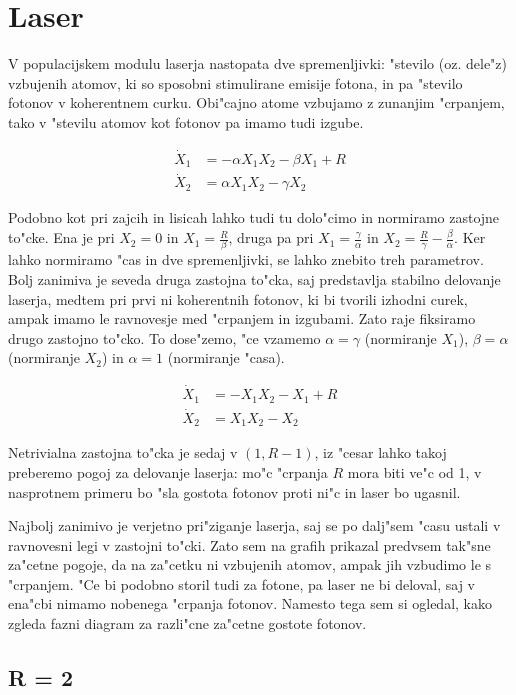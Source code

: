 \documentclass[a4paper,10pt]{article}
\begin{document}
\clearpage
\section{Laser}

V populacijskem modulu laserja nastopata dve spremenljivki: "stevilo (oz. dele"z) vzbujenih atomov, ki so sposobni stimulirane emisije fotona, in pa "stevilo fotonov v koherentnem curku. Obi"cajno atome vzbujamo z zunanjim "crpanjem, tako v "stevilu atomov kot fotonov pa imamo tudi izgube. 

\begin{align}
  \dot X_1 &= -\alpha X_1 X_2 - \beta X_1 + R \\
  \dot X_2 &= \alpha X_1 X_2 - \gamma X_2
\end{align}

Podobno kot pri zajcih in lisicah lahko tudi tu dolo"cimo in normiramo zastojne to"cke. Ena je pri $X_2=0$ in $X_1 = \frac{R}{\beta}$, druga pa pri $X_1 = \frac{\gamma}{\alpha}$ in $X_2 = \frac{R}{\gamma} - \frac{\beta}{\alpha}$. Ker lahko normiramo "cas in dve spremenljivki, se lahko znebito treh parametrov. Bolj zanimiva je seveda druga zastojna to"cka, saj predstavlja stabilno delovanje laserja, medtem pri prvi ni koherentnih fotonov, ki bi tvorili izhodni curek, ampak imamo le ravnovesje med "crpanjem in izgubami. Zato raje fiksiramo drugo zastojno to"cko. To dose"zemo, "ce vzamemo $\alpha=\gamma$ (normiranje $X_1$), $\beta=\alpha$ (normiranje $X_2$) in $\alpha=1$ (normiranje "casa). 

\begin{align}
  \dot X_1 &= -X_1 X_2 - X_1 + R \\
  \dot X_2 &= X_1 X_2 - X_2
\end{align}

Netrivialna zastojna to"cka je sedaj v $(1,R-1)$, iz "cesar lahko takoj preberemo pogoj za delovanje laserja: mo"c "crpanja $R$ mora biti ve"c od 1, v nasprotnem primeru bo "sla gostota fotonov proti ni"c in laser bo ugasnil. 

Najbolj zanimivo je verjetno pri"ziganje laserja, saj se po dalj"sem "casu ustali v ravnovesni legi v zastojni to"cki. Zato sem na grafih prikazal predvsem tak"sne za"cetne pogoje, da na za"cetku ni vzbujenih atomov, ampak jih vzbudimo le s "crpanjem. "Ce bi podobno storil tudi za fotone, pa laser ne bi deloval, saj v ena"cbi nimamo nobenega "crpanja fotonov. Namesto tega sem si ogledal, kako zgleda fazni diagram za razli"cne za"cetne gostote fotonov. 

\subsection{R = 2}
\end{document}
